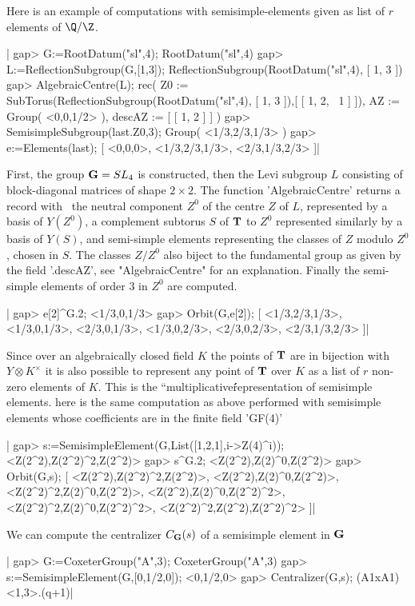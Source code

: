 Here  is an example of computations  with semisimple-elements given as list
of $r$ elements of $\Q/\Z$.

|    gap> G:=RootDatum("sl",4);
    RootDatum("sl",4)
    gap> L:=ReflectionSubgroup(G,[1,3]);
    ReflectionSubgroup(RootDatum("sl",4), [ 1, 3 ])
    gap> AlgebraicCentre(L);
    rec(
      Z0 :=
       SubTorus(ReflectionSubgroup(RootDatum("sl",4), [ 1, 3 ]),[ [ 1, 2, \
    1 ] ]),
      AZ := Group( <0,0,1/2> ),
      descAZ := [ [ 1, 2 ] ] )
    gap> SemisimpleSubgroup(last.Z0,3);
    Group( <1/3,2/3,1/3> )
    gap> e:=Elements(last);
    [ <0,0,0>, <1/3,2/3,1/3>, <2/3,1/3,2/3> ]|

First,  the group  ${\mathbf G}=SL_4$ is  constructed, then  the Levi  subgroup $L$
consisting  of block-diagonal matrices  of shape $2\times  2$. The function
'AlgebraicCentre'  returns a record with \:\ the neutral component $Z^0$ of
the  centre $Z$ of  $L$, represented by  a basis of  $Y(Z^0)$, a complement
subtorus  $S$ of ${\mathbf T}$ to $Z^0$ represented similarly by a basis of $Y(S)$,
and  semi-simple elements  representing the  classes of  $Z$ modulo $Z^0$ ,
chosen  in $S$. The classes $Z/Z^0$ also biject to the fundamental group as
given  by the  field '.descAZ',  see "AlgebraicCentre"  for an explanation.
Finally the semi-simple elements of order 3 in $Z^0$ are computed.

|    gap> e[2]^G.2;
    <1/3,0,1/3>
    gap> Orbit(G,e[2]);
    [ <1/3,2/3,1/3>, <1/3,0,1/3>, <2/3,0,1/3>, <1/3,0,2/3>, <2/3,0,2/3>,
      <2/3,1/3,2/3> ]|

Since  over an algebraically  closed field $K$  the points of  ${\mathbf T}$ are in
bijection  with $Y\otimes  K^\times$ it  is also  possible to represent any
point  of ${\mathbf T}$ over $K$ as a list of $r$ non-zero elements of $K$. This is
the ``multiplicative\'\' representation of semisimple elements. here is the
same   computation  as  above  performed  with  semisimple  elements  whose
coefficients are in the finite field 'GF(4)'\:

|    gap> s:=SemisimpleElement(G,List([1,2,1],i->Z(4)^i));
    <Z(2^2),Z(2^2)^2,Z(2^2)>
    gap> s^G.2;
    <Z(2^2),Z(2)^0,Z(2^2)>
    gap> Orbit(G,s);
    [ <Z(2^2),Z(2^2)^2,Z(2^2)>, <Z(2^2),Z(2)^0,Z(2^2)>,
      <Z(2^2)^2,Z(2)^0,Z(2^2)>, <Z(2^2),Z(2)^0,Z(2^2)^2>,
      <Z(2^2)^2,Z(2)^0,Z(2^2)^2>, <Z(2^2)^2,Z(2^2),Z(2^2)^2> ]|

We  can  compute  the  centralizer  $C_{\mathbf G}(s)$  of  a semisimple element in
${\mathbf G}$\:

|    gap> G:=CoxeterGroup("A",3);
    CoxeterGroup("A",3)
    gap> s:=SemisimpleElement(G,[0,1/2,0]);
    <0,1/2,0>
    gap> Centralizer(G,s);
    (A1xA1)<1,3>.(q+1)|

